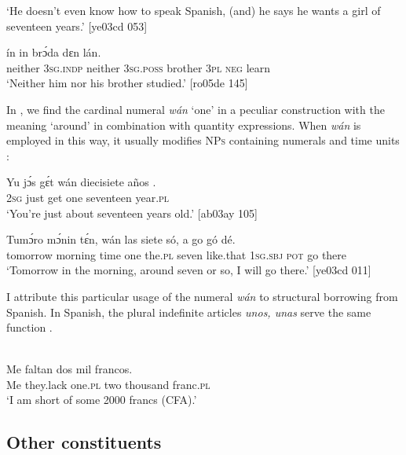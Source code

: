 \glt ‘He doesn’t even know how to speak Spanish, (and) he says he wants 
a girl of seventeen years.’ [ye03cd 053]
\z


\ea%
    \label{ex:key:1731}
    \gll {}    ín        in    brɔ́da  dɛn    lán.\\
neither  \textsc{3sg.indp}  neither  \textsc{3sg.poss}  brother  \textsc{3pl}  \textsc{neg}  learn\\

\glt ‘Neither him nor his brother studied.’ [ro05de 145]
\z

In , we find the cardinal numeral \textit{wán} ‘one’ in a peculiar construction with the meaning ‘around’ in combination with quantity expressions.\textit{} When \textit{wán} is employed in this way, it usually modifies \textsc{NPs} containing numerals  and time units : 


\ea%
    \label{ex:key:1732}
    \gll Yu  jɔ́s  gɛ́t  wán    diecisiete    años  .\\
\textsc{2sg}  just  get  one    seventeen  year.\textsc{pl}\\

\glt ‘You’re just about seventeen years old.’ [ab03ay 105]
\z


\ea%
    \label{ex:key:1733}
    \gll Tumɔ́ro    mɔ́nin  tɛ́n,    wán  las    siete    só,    a    go  gó  dé.\\
tomorrow  morning  time    one  the.\textsc{pl}  seven  like.that  \textsc{1sg.sbj}  \textsc{pot}  go  there\\

\glt ‘Tomorrow in the morning, around seven or so, I will go there.’ [ye03cd 011]
\z

I attribute this particular usage of the numeral \textit{wán} to structural borrowing from Spanish. In Spanish, the plural indefinite articles \textit{unos, unas} serve the same function . 


\ea%
    \label{ex:key:1734}
\\
    \gll Me  faltan      dos  mil      francos.\\
Me  they.lack    one.\textsc{pl}  two  thousand  franc.\textsc{pl}\\

\glt ‘I am short of some 2000 francs (CFA).’
\z

\subsection{Other constituents}

